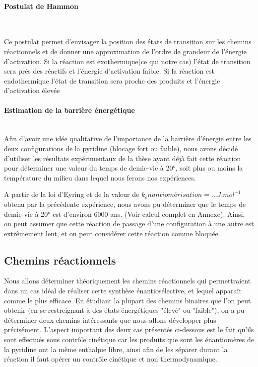 \documentclass{article}
\newcommand{\pparagraph}[1]{\paragraph{#1}\mbox{}\\}
\begin{document}
\medbreak

\pparagraph{Postulat de Hammon}
\par
Ce postulat permet d’envisager la position des états de transition sur les chemins réactionnels et de donner une approximation de l’ordre de grandeur de l’énergie d’activation.
Si la réaction est exothermique(ce qui notre cas) l’état de transition sera près des réactifs et l’énergie d’activation faible.
Si la réaction est endothermique l’état de transition sera proche des produits et l’énergie d’activation élevée
\medbreak
\pparagraph{Estimation de la barrière énergétique}

Afin d’avoir une idée qualitative de l’importance de la barrière d'énergie entre les deux configurations de la pyridine (blocage fort ou faible), nous avons décidé d’utiliser les résultats expérimentaux de la thèse ayant déjà fait cette réaction pour déterminer une valeur du temps de demie-vie à 20°, soit plus ou moins la température du milieu dans lequel nous ferons nos expériences.

A partir de la loi d’Eyring et de la valeur de $k_enantiomérisation = … J.mol^{-1}$ obtenu par la précédente expérience, nous avons pu déterminer que le temps de demie-vie à 20° est d’environ 6000 ans. (Voir calcul complet en Annexe). Ainsi, on peut assumer que cette réaction de passage d’une configuration à une autre est extrêmement lent, et on peut considérer cette réaction comme bloquée.

\medbreak
\subsection{Chemins réactionnels}

Nous allons déterminer théoriquement les chemins réactionnels qui permettraient dans un cas idéal de réaliser cette synthèse énantiosélective, et lequel apparaît comme le plus efficace.  En étudiant la plupart des chemins binaires que l'on peut obtenir (en se restreignant à des états énergétiques "élevé" ou "faible"), on a pu déterminer deux chemins intéressants que nous allons développer plus précisément. L’aspect important des deux cas présentés ci-dessous est le fait qu’ils sont effectués sous contrôle cinétique car les produits que sont les énantiomères de la pyridine ont la même enthalpie libre, ainsi afin de les séparer durant la réaction il faut opérer un contrôle cinétique et non thermodynamique.

\medbreak
              
\end{document}
